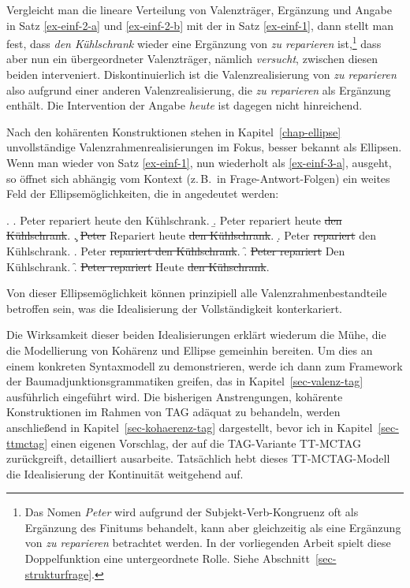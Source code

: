 Vergleicht man die lineare Verteilung von Valenzträger, Ergänzung und Angabe in Satz \ref{ex-einf-2-a} und \ref{ex-einf-2-b} mit der in Satz \ref{ex-einf-1}, dann stellt man fest, dass {\it den Kühlschrank} wieder eine Ergänzung von {\it zu reparieren} ist,\footnote{Das Nomen {\it Peter} wird aufgrund der Subjekt-Verb-Kongruenz oft als Ergänzung des Finitums behandelt, kann aber gleichzeitig als eine Ergänzung von {\it zu reparieren} betrachtet werden. In der vorliegenden Arbeit spielt diese Doppelfunktion eine untergeordnete Rolle. Siehe Abschnitt~\ref{sec-strukturfrage}.} dass aber nun ein übergeordneter Valenzträger, nämlich {\it versucht}, zwischen diesen beiden interveniert. Diskontinuierlich ist die Valenzrealisierung von \textit{zu reparieren} also aufgrund einer anderen Valenzrealisierung, die \textit{zu reparieren} als Ergänzung enthält. Die Intervention der Angabe \textit{heute} ist dagegen nicht hinreichend.

Nach den kohärenten Konstruktionen stehen in Kapitel~\ref{chap-ellipse} unvollständige Valenzrahmenrealisierungen im Fokus, besser bekannt als Ellipsen. Wenn man wieder von Satz \ref{ex-einf-1}, nun wiederholt als \ref{ex-einf-3-a}, ausgeht, so öffnet sich abhängig vom Kontext (z.\,B.\ in Frage-Antwort-Folgen) ein weites Feld der Ellipsemöglichkeiten, die in \Next[b--g] angedeutet werden:       
  
  \ex. \label{ex-einf-3}
  \a. \label{ex-einf-3-a} Peter repariert heute den Kühlschrank. 
  \b. \label{ex-einf-3-b} Peter repariert heute \sout{den Kühlschrank}.
  \c. \sout{Peter} Repariert heute \sout{den Kühlschrank}.
  \d. Peter \sout{repariert} den Kühlschrank.
  \e. Peter \sout{repariert den Kühlschrank}.
  \f. \sout{Peter repariert} Den Kühlschrank.
  \f. \label{ex-einf-3-f} \sout{Peter repariert} Heute \sout{den Kühschrank}.

Von dieser Ellipsemöglichkeit können prinzipiell alle Valenzrahmenbestandteile betroffen sein, was die Idealisierung der Vollständigkeit konterkariert.%
  
Die Wirksamkeit dieser beiden Idealisierungen erklärt wiederum die Mühe, die die Modellierung von Kohärenz und Ellipse gemeinhin bereiten. Um dies an einem konkreten Syntaxmodell zu demonstrieren, werde ich dann zum Framework der Baumadjunktionsgrammatiken greifen, das in Kapitel~\ref{sec-valenz-tag} ausführlich eingeführt wird. Die bisherigen Anstrengungen, kohärente Konstruktionen im Rahmen von TAG adäquat zu behandeln, werden anschlie\ss end in Kapitel~\ref{sec-kohaerenz-tag} dargestellt, bevor ich in Kapitel~\ref{sec-ttmctag} einen eigenen Vorschlag, der auf die TAG-Variante TT-MCTAG zurückgreift, detailliert ausarbeite. Tatsächlich hebt dieses TT-MCTAG-Modell die Idealisierung der Kontinuität weitgehend auf. 

